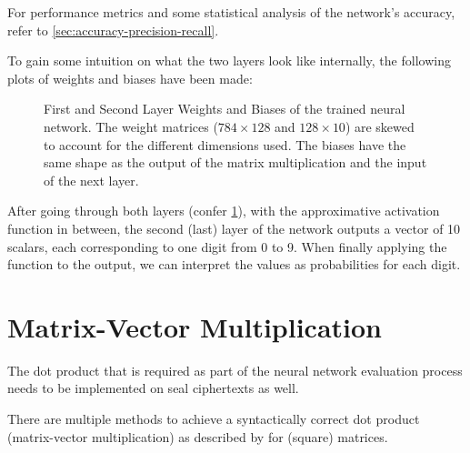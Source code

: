 For performance metrics and some statistical analysis of the network's accuracy, refer to \cref{sec:accuracy-precision-recall}.

To gain some intuition on what the two layers look like internally, the following plots of weights and biases have been made:
\begin{figure}[H]
  \centering
  \caption[Weights and biases of our neural network]{
    First and Second Layer Weights and Biases of the trained neural network.
    The weight matrices ($784 \times 128$ and $128 \times 10$) are skewed to account for the different dimensions used.
    The biases have the same shape as the output of the matrix multiplication and the input of the next layer.
  }
  \label{fig:layer-1-and-2}
\end{figure}

After going through both layers (confer \cref{fig:layer-1-and-2}), with the approximative  activation function in between, the second (last) layer of the network outputs a vector of 10 scalars, each corresponding to one digit from 0 to 9.
When finally applying the  function to the output, we can interpret the values as probabilities for each digit.

\pagebreak
\section{Matrix-Vector Multiplication}
\label{sec:matmul}
The dot product that is required as part of the neural network evaluation process needs to be implemented on \gls{seal} ciphertexts as well.

There are multiple methods to achieve a syntactically correct dot product (matrix-vector multiplication) as described by \textcite{2018-gazelle} for (square) matrices.

